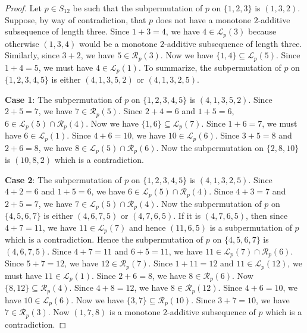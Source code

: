 \documentclass[11pt]{article}
\theoremstyle{definition}
\begin{document}
\begin{proof}
    Let $p\in S_{12}$ be such that the subpermutation of $p$ on $\{1,2,3\}$ is $(1,3,2)$. Suppose, by way of contradiction, that $p$ does not have a monotone $2$-additive subsequence of length three. Since $1+3=4$, we have $4\in\mathcal{L}_p(3)$ because otherwise $(1,3,4)$ would be a monotone $2$-additive subsequence of length three. Similarly, since $3+2$, we have $5\in\mathcal{R}_p(3)$. Now we have $\{1,4\}\subseteq\mathcal{L}_p(5)$. Since $1+4=5$, we must have $4\in\mathcal{L}_p(1)$. To summarize, the subpermutation of $p$ on $\{1,2,3,4,5\}$ is either $(4,1,3,5,2)$ or $(4,1,3,2,5)$.

    {\bf Case 1}: The subpermutation of $p$ on $\{1,2,3,4,5\}$ is $(4,1,3,5,2)$. Since $2+5=7$, we have $7\in\mathcal{R}_p(5)$. Since $2+4=6$ and $1+5=6$, $6\in\mathcal{L}_p(5)\cap\mathcal{R}_p(4)$. Now we have $\{1,6\}\subseteq\mathcal{L}_p(7)$. Since $1+6=7$, we must have $6\in\mathcal{L}_p(1)$. Since $4+6=10$, we have $10\in\mathcal{L}_p(6)$. Since $3+5=8$ and $2+6=8$, we have $8\in\mathcal{L}_p(5)\cap\mathcal{R}_p(6)$. Now the subpermutation on $\{2,8,10\}$ is $(10,8,2)$ which is a contradiction.

    {\bf Case 2}: The subpermutation of $p$ on $\{1,2,3,4,5\}$ is $(4,1,3,2,5)$. Since $4+2=6$ and $1+5=6$, we have $6\in\mathcal{L}_p(5)\cap\mathcal{R}_p(4)$. Since $4+3=7$ and $2+5=7$, we have $7\in\mathcal{L}_p(5)\cap\mathcal{R}_p(4)$. Now the subpermutation of $p$ on $\{4,5,6,7\}$ is either $(4,6,7,5)$ or $(4,7,6,5)$. If it is $(4,7,6,5)$, then since $4+7=11$, we have $11\in\mathcal{L}_p(7)$ and hence $(11,6,5)$ is a subpermutation of $p$ which is a contradiction. Hence the subpermutation of $p$ on $\{4,5,6,7\}$ is $(4,6,7,5)$. Since $4+7=11$ and $6+5=11$, we have $11\in\mathcal{L}_p(7)\cap\mathcal{R}_p(6)$. Since $5+7=12$, we have $12\in\mathcal{R}_p(7)$. Since $1+11=12$ and $11\in\mathcal{L}_p(12)$, we must have $11\in\mathcal{L}_p(1)$. Since $2+6=8$, we have $8\in\mathcal{R}_p(6)$. Now $\{8,12\}\subseteq\mathcal{R}_p(4)$. Since $4+8=12$, we have $8\in\mathcal{R}_p(12)$. Since $4+6=10$, we have $10\in\mathcal{L}_p(6)$. Now we have $\{3,7\}\subseteq\mathcal{R}_p(10)$. Since $3+7=10$, we have $7\in\mathcal{R}_p(3)$. Now $(1,7,8)$ is a monotone $2$-additive subsequence of $p$ which is a contradiction.
\end{proof}
\end{document}
